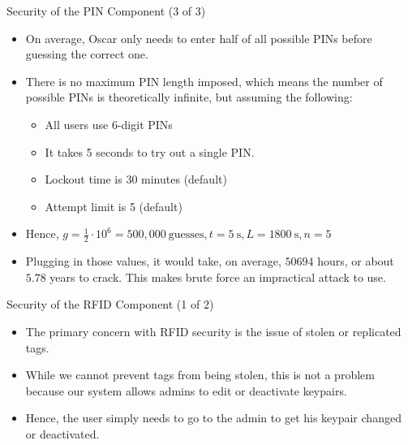 \begin{frame}{Security of the PIN Component (3 of 3)}
\begin{itemize}
	\item<1-> On average, Oscar only needs to enter half of all possible PINs before guessing the correct one.
	\item<2-> There is no maximum PIN length imposed, which means the number of possible PINs is theoretically infinite, but assuming the following:
	\begin{itemize}
		\item<3-> All users use 6-digit PINs
		\item<4-> It takes 5 seconds to try out a single PIN.
		\item<5-> Lockout time is 30 minutes (default) 
		\item<6-> Attempt limit is 5 (default) 
	\end{itemize}
	\item<7-> Hence, $ g = \frac12 \cdot 10^6 = 500,000 \:\mathrm{guesses}, t = 5 \:\mathrm{s}, L = 1800 \:\mathrm{s}, n = \mathrm{5}$
	\item<8-> Plugging in those values, it would take, on average, $50694$ hours, or about $5.78$ years to crack. This makes brute force an impractical attack to use.
\end{itemize}
\end{frame}

\begin{frame}{Security of the RFID Component (1 of 2)}
\begin{itemize}
    \item<1-> The primary concern with RFID security is the issue of stolen or replicated tags.
    \item<2-> While we cannot prevent tags from being stolen, this is not a problem because our system allows admins to edit or deactivate keypairs.
    \item<3-> Hence, the user simply needs to go to the admin to get his keypair changed or deactivated.
\end{itemize}
\end{frame}

